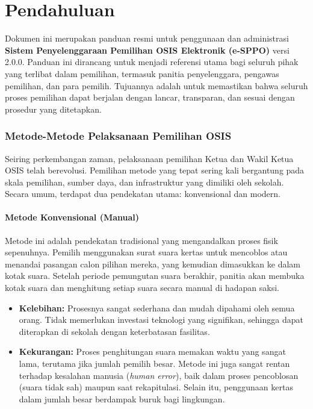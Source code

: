 
\part{Pendahuluan}
\label{part:pendahuluan}

Dokumen ini merupakan panduan resmi untuk penggunaan dan administrasi \textbf{Sistem Penyelenggaraan Pemilihan OSIS Elektronik (e-SPPO)} versi 2.0.0. Panduan ini dirancang untuk menjadi referensi utama bagi seluruh pihak yang terlibat dalam pemilihan, termasuk panitia penyelenggara, pengawas pemilihan, dan para pemilih. Tujuannya adalah untuk memastikan bahwa seluruh proses pemilihan dapat berjalan dengan lancar, transparan, dan sesuai dengan prosedur yang ditetapkan.

\section{Metode-Metode Pelaksanaan Pemilihan OSIS}
\label{sec:metode_pemilihan}

Seiring perkembangan zaman, pelaksanaan pemilihan Ketua dan Wakil Ketua OSIS telah berevolusi. Pemilihan metode yang tepat sering kali bergantung pada skala pemilihan, sumber daya, dan infrastruktur yang dimiliki oleh sekolah. Secara umum, terdapat dua pendekatan utama: konvensional dan modern.

\subsection{Metode Konvensional (Manual)}
Metode ini adalah pendekatan tradisional yang mengandalkan proses fisik sepenuhnya. Pemilih menggunakan surat suara kertas untuk mencoblos atau menandai pasangan calon pilihan mereka, yang kemudian dimasukkan ke dalam kotak suara. Setelah periode pemungutan suara berakhir, panitia akan membuka kotak suara dan menghitung setiap suara secara manual di hadapan saksi.

\begin{itemize}
	\item \textbf{Kelebihan:} Prosesnya sangat sederhana dan mudah dipahami oleh semua orang. Tidak memerlukan investasi teknologi yang signifikan, sehingga dapat diterapkan di sekolah dengan keterbatasan fasilitas.
	\item \textbf{Kekurangan:} Proses penghitungan suara memakan waktu yang sangat lama, terutama jika jumlah pemilih besar. Metode ini juga sangat rentan terhadap kesalahan manusia (\textit{human error}), baik dalam proses pencoblosan (suara tidak sah) maupun saat rekapitulasi. Selain itu, penggunaan kertas dalam jumlah besar berdampak buruk bagi lingkungan.
\end{itemize}

